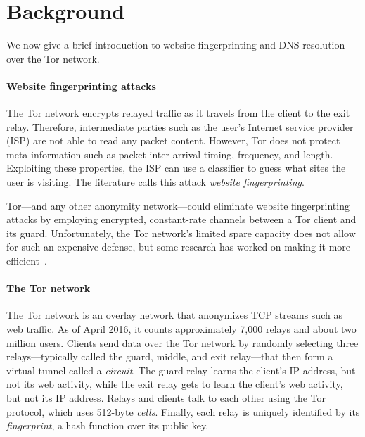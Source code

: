 \section{Background}
\label{sec:background}
We now give a brief introduction to website fingerprinting and DNS resolution
over the Tor network.

\paragraph{Website fingerprinting attacks}
The Tor network encrypts relayed traffic as it travels from the client to the
exit relay.  Therefore, intermediate parties such as the user's Internet service
provider (ISP) are not able to read any packet content.  However, Tor does not
protect meta information such as packet inter-arrival timing, frequency, and
length.  Exploiting these properties, the ISP can use a classifier to guess what
sites the user is visiting.  The literature calls this attack \emph{website
fingerprinting}.

Tor---and any other anonymity network---could eliminate website fingerprinting
attacks by employing encrypted, constant-rate channels between a Tor client and
its guard.  Unfortunately, the Tor network's limited spare capacity does not
allow for such an expensive defense, but some research has worked on making it
more efficient~\cite{Cai2014a,DBLP:journals/corr/JuarezIPDW15,WangThesis}.

\paragraph{The Tor network}
The Tor network is an overlay network that anonymizes TCP streams such as web
traffic.  As of April 2016, it counts approximately 7,000 relays and about two
million users.  Clients send data over the Tor network by randomly selecting
three relays---typically called the guard, middle, and exit relay---that then
form a virtual tunnel called a \emph{circuit}.  The guard relay learns the
client's IP address, but not its web activity, while the exit relay gets to
learn the client's web activity, but not its IP address.  Relays and clients
talk to each other using the Tor protocol, which uses 512-byte \emph{cells}.
Finally, each relay is uniquely identified by its \emph{fingerprint}, a hash
function over its public key.

